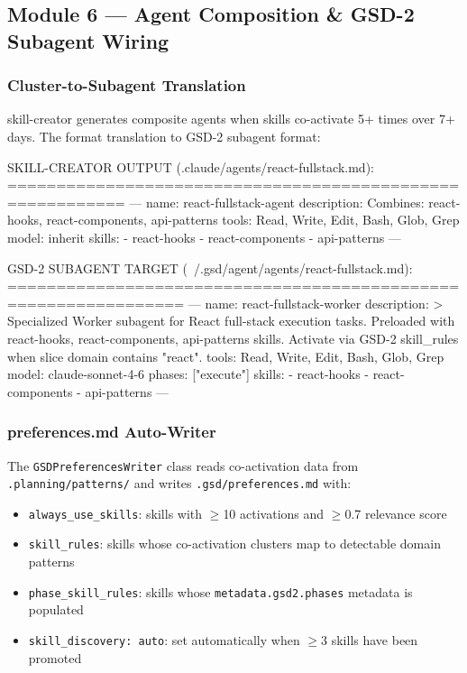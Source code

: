 \documentclass[11pt,letterpaper]{article}
\begin{document}
\subsection{Module 6 --- Agent Composition \& GSD-2 Subagent Wiring}

\subsubsection{Cluster-to-Subagent Translation}

skill-creator generates composite agents when skills co-activate 5+ times over 7+ days. The format translation to GSD-2 subagent format:

\begin{asciibox}
SKILL-CREATOR OUTPUT (.claude/agents/react-fullstack.md):
==========================================================
---
name: react-fullstack-agent
description: Combines: react-hooks, react-components, api-patterns
tools: Read, Write, Edit, Bash, Glob, Grep
model: inherit
skills:
  - react-hooks
  - react-components
  - api-patterns
---

GSD-2 SUBAGENT TARGET (~/.gsd/agent/agents/react-fullstack.md):
================================================================
---
name: react-fullstack-worker
description: >
  Specialized Worker subagent for React full-stack execution tasks.
  Preloaded with react-hooks, react-components, api-patterns skills.
  Activate via GSD-2 skill_rules when slice domain contains "react".
tools: Read, Write, Edit, Bash, Glob, Grep
model: claude-sonnet-4-6
phases: ["execute"]
skills:
  - react-hooks
  - react-components
  - api-patterns
---
\end{asciibox}

\subsubsection{preferences.md Auto-Writer}

The \texttt{GSDPreferencesWriter} class reads co-activation data from \texttt{.planning/patterns/} and writes \texttt{.gsd/preferences.md} with:

\begin{itemize}
  \item \texttt{always\_use\_skills}: skills with $\geq$10 activations and $\geq$0.7 relevance score
  \item \texttt{skill\_rules}: skills whose co-activation clusters map to detectable domain patterns
  \item \texttt{phase\_skill\_rules}: skills whose \texttt{metadata.gsd2.phases} metadata is populated
  \item \texttt{skill\_discovery: auto}: set automatically when $\geq$3 skills have been promoted
\end{itemize}
\end{document}
